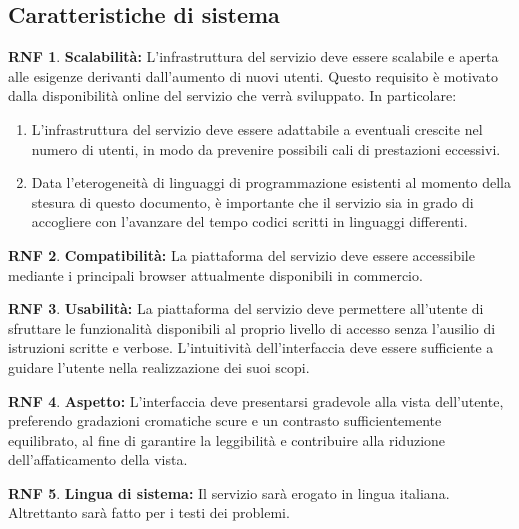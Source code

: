\documentclass[11pt, a4paper]{article}
\theoremstyle{definition}
\newtheorem{nonfuncreq}{RNF} %
\begin{document}
\subsection{Caratteristiche di sistema}

\begin{nonfuncreq}
\label{scalabilita}
\textbf{Scalabilità:}
L'infrastruttura del servizio deve essere scalabile e aperta alle esigenze
derivanti dall'aumento di nuovi utenti. Questo requisito è motivato dalla
disponibilità online del servizio che verrà sviluppato. In particolare:
\begin{enumerate}
    \item L'infrastruttura del servizio deve essere adattabile a eventuali
    crescite nel numero di utenti, in modo da prevenire possibili cali di
    prestazioni eccessivi.

    \item Data l'eterogeneità di linguaggi di programmazione esistenti
    al momento della stesura di questo documento, è importante che il
    servizio sia in grado di accogliere con l'avanzare del tempo codici
    scritti in linguaggi differenti.
\end{enumerate}
\end{nonfuncreq}

\begin{nonfuncreq}
\label{compatibility}
\textbf{Compatibilità:}
La piattaforma del servizio deve essere accessibile mediante i principali
browser attualmente disponibili in commercio.
\end{nonfuncreq}


\begin{nonfuncreq}
\textbf{Usabilità:}
La piattaforma del servizio deve permettere all'utente di sfruttare le
funzionalità disponibili al proprio livello di accesso senza l'ausilio di
istruzioni scritte e verbose. L'intuitività dell'interfaccia deve essere
sufficiente a guidare l'utente nella realizzazione dei suoi scopi.
\end{nonfuncreq}

\begin{nonfuncreq}
\textbf{Aspetto:}
L'interfaccia deve presentarsi gradevole alla vista dell'utente, preferendo
gradazioni cromatiche scure e un contrasto sufficientemente equilibrato,
al fine di garantire la leggibilità e contribuire alla riduzione
dell'affaticamento della vista.
\end{nonfuncreq}

\begin{nonfuncreq}
\textbf{Lingua di sistema:}
Il servizio sarà erogato in lingua italiana. Altrettanto sarà fatto per i
testi dei problemi.
\end{nonfuncreq}
\end{document}
